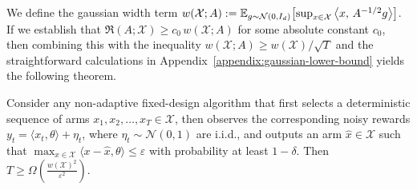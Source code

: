 We define the gaussian width term $w(\mathcal{X};A):=\mathbb{E}_{g\sim\mathcal N(0,I_d)}\!\left[\sup_{x\in \mathcal{X}}\left\langle x,\,A^{-1/2}g \right\rangle\right]$. 
If we establish that $\mathfrak{R}(A;\mathcal{X}) \ge c_0\, w(\mathcal{X};A)$ for some absolute constant $c_0$, then combining this with the inequality $w(\mathcal{X};A)\ge w(\mathcal{X})/\sqrt{T}$ and the straightforward calculations in Appendix~\ref{appendix:gaussian-lower-bound} yields the following theorem.
\begin{theorem}\label{thm:adaptive-lower-bound}
Consider any non-adaptive fixed-design algorithm that first selects a deterministic sequence of arms $x_1,x_2,\ldots,x_T\in\mathcal{X}$, then observes the corresponding noisy rewards $y_t=\langle x_t,\theta\rangle+\eta_t$, where $\eta_t\sim\mathcal{N}(0,1)$ are i.i.d., and outputs an arm $\widehat{x}\in\mathcal{X}$ such that $\max_{x\in\mathcal{X}} \langle x-\widehat{x},\theta\rangle \le \varepsilon$ with probability at least $1-\delta$.
Then $T \ge \Omega\!\left(\frac{w(\mathcal{X})^2}{\varepsilon^2}\right)$.
\end{theorem}

